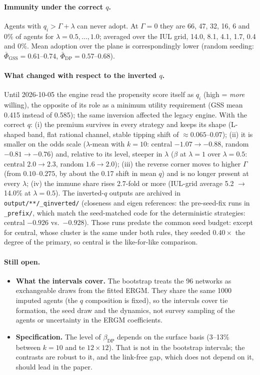 \documentclass[11pt,a4paper]{article}
\newcommand{\code}[1]{\texttt{#1}}
\begin{document}
\paragraph{Immunity under the correct $q$.} Agents with $q_i > \Gamma + \lambda$ can never
adopt. At $\Gamma = 0$ they are 66, 47, 32, 16, 6 and 0\% of agents for
$\lambda = 0.5, \dots, 1.0$; averaged over the IUL grid, 14.0, 8.1, 4.1, 1.7, 0.4 and 0\%.
Mean adoption over the plane is correspondingly lower (random seeding:
$\bar\Phi_{\text{GSS}} = 0.61$--$0.74$, $\bar\Phi_{\text{DP}} = 0.57$--$0.68$).

\paragraph{What changed with respect to the inverted $q$.} Until 2026-10-05 the engine read
the propensity score itself as $q_i$ (high = \emph{more} willing), the opposite of its role
as a minimum utility requirement (GSS mean 0.415 instead of 0.585); the same inversion
affected the legacy engine. With the correct $q$: (i) the premium survives in every
strategy and keeps its shape (L-shaped band, flat rational channel, stable tipping shift
of $\approx 0.065$--$0.07$); (ii) it is smaller on the odds scale ($\lambda$-mean with
$k = 10$: central $-1.07 \to -0.88$, random $-0.81 \to -0.76$) and, relative to its
level, steeper in $\lambda$ ($\beta$ at $\lambda = 1$ over $\lambda = 0.5$: central
$2.0 \to 2.3$, random $1.6 \to 2.0$); (iii) the reverse corner moves to higher $\Gamma$ (from $0.10$--$0.275$, by
about the 0.17 shift in mean $q$) and is no longer present at every $\lambda$; (iv) the
immune share rises 2.7-fold or more (IUL-grid average 5.2 $\to$ 14.0\% at $\lambda = 0.5$).
The inverted-$q$ outputs are archived in \code{output/**/\_qinverted/} (closeness and eigen
references: the pre-seed-fix runs in \code{\_prefix/}, which match the seed-matched code
for the deterministic strategies: central $-0.926$ vs.\ $-0.928$). Those runs predate the
common seed budget: except for central, whose cluster is the same under both rules, they
seeded $0.40 \times$ the degree of the primary, so central is the like-for-like comparison.

\paragraph{Still open.}
\begin{itemize}
  \item \textbf{What the intervals cover.} The bootstrap treats the 96 networks as
    exchangeable draws from the fitted ERGM. They share the same 1000 imputed agents (the
    $q$ composition is fixed), so the intervals cover tie formation, the seed draw and the
    dynamics, not survey sampling of the agents or uncertainty in the ERGM coefficients.
  \item \textbf{Specification.} The level of $\beta_{\text{DP}}$ depends on the surface
    basis (3--13\% between $k = 10$ and te $12 \times 12$). That is not in the bootstrap
    intervals; the contrasts are robust to it, and the link-free gap, which does not depend
    on it, should lead in the paper.
\end{itemize}
\end{document}
